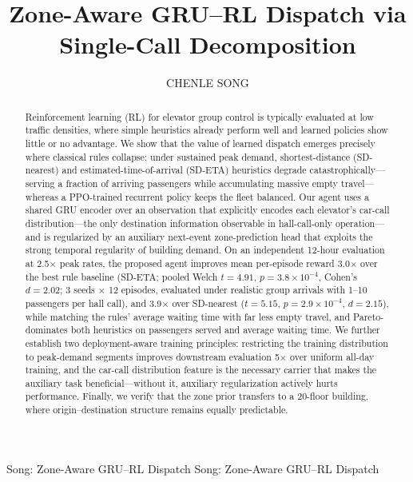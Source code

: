 \documentclass{ieeeaccess}
\begin{document}

\title{Zone-Aware GRU--RL Dispatch via
Single-Call Decomposition}

\author{\uppercase{Chenle Song}}

\address[1]{School of Communications and Information Engineering,
Nanjing University of Posts and Telecommunications, Nanjing, China
(e-mail: songchenle@njupt.edu.cn)}


\markboth
{Song: Zone-Aware GRU--RL Dispatch}
{Song: Zone-Aware GRU--RL Dispatch}


\begin{abstract}
Reinforcement learning (RL) for elevator group control is typically
evaluated at low traffic densities, where simple heuristics already
perform well and learned policies show little or no advantage. We
show that the value of learned dispatch emerges precisely where
classical rules collapse: under sustained peak demand,
shortest-distance (SD-nearest) and estimated-time-of-arrival
(SD-ETA) heuristics degrade catastrophically---serving a fraction of
arriving passengers while accumulating massive empty travel---whereas
a PPO-trained recurrent policy keeps the fleet balanced. Our agent
uses a shared GRU encoder over an observation that explicitly encodes
each elevator's car-call distribution---the only destination
information observable in hall-call-only operation---and is
regularized by an auxiliary next-event zone-prediction head that
exploits the strong temporal regularity of building demand. On an
independent 12-hour evaluation at 2.5$\times$ peak rates, the
proposed agent improves mean per-episode reward 3.0$\times$ over the
best rule baseline (SD-ETA; pooled Welch $t = 4.91$,
$p = 3.8\times10^{-4}$, Cohen's $d = 2.02$; 3 seeds $\times$ 12
episodes, evaluated under realistic group arrivals with 1--10
passengers per hall call), and 3.9$\times$ over SD-nearest
($t = 5.15$, $p = 2.9\times10^{-4}$, $d = 2.15$), while matching the
rules' average waiting time with far less empty travel, and
Pareto-dominates both heuristics on passengers served and average
waiting time. We further establish two deployment-aware training
principles: restricting the training distribution to peak-demand
segments improves downstream evaluation 5$\times$ over uniform
all-day training, and the car-call distribution feature is the
necessary carrier that makes the auxiliary task beneficial---without
it, auxiliary regularization actively hurts performance. Finally, we
verify that the zone prior transfers to a 20-floor building, where
origin--destination structure remains equally predictable.
\end{abstract}
\end{document}
